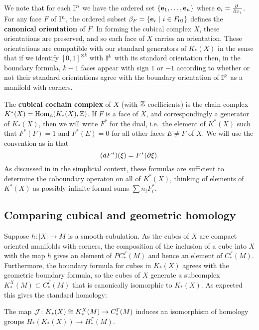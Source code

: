 We note that for each $\mathbb{I}^n$ we have the ordered set $\{\mathbf{e}_1, \dots, \mathbf{e}_n\}$ where $\mathbf{e}_i = \frac{\partial\ }{\partial x_i}$.
For any face $F$ of $\mathbb{I}^n$, the ordered subset $\beta_F = \{\mathbf{e}_i\ |\ i \in F_{01}\}$ defines the \textbf{canonical orientation} of $F$.
In forming the cubical complex $X$, these orientations are preserved, and so each face of $X$ carries an orientation.
These orientations are compatible with our standard generators of $K_*(X)$ in the sense that if we identify $[0,1]^{ \otimes k}$ with $\mathbb{I}^k$ with its standard orientation then, in the boundary formula, $k-1$ faces appear with sign $1$ or $-1$ according to whether or not their standard orientations agree with the boundary orientation of $\mathbb{I}^k$ as a manifold with corners.

The \textbf{cubical cochain complex} of $X$ (with $\mathbb{Z}$ coefficients) is the chain complex $K^*(X) = \textup{Hom}_{\mathbb{Z}}(K_*(X), \mathbb{Z})$.
If $F$ is a face of $X$, and correspondingly a generator of $K_*(X)$, then we will write $F^*$ for the dual, i.e.\ the element of $K^*(X)$ such that $F^*(F) = 1$ and $F^*(E) = 0$ for all other faces $E\neq F$ of $X$.
We will use the convention as in \cite[Section 42]{Mun84} that
$$(dF^*)(\xi) = F^*(\partial \xi).$$
As discussed in \cite[Section 42]{Mun84} in the simplicial context, these formulas are sufficient to determine the coboundary operaton on all of $K^*(X)$, thinking of elements of $K^*(X)$ as possibly infinite formal sums $\sum n_i F_i^*$.


\subsection{Comparing cubical and geometric homology}\label{S: cubical and geometric homology}

Suppose $h \colon |X| \to M$ is a smooth cubulation.
As the cubes of $X$ are compact oriented manifolds with corners, the composition of the inclusion of a cube into $X$ with the map $h$ gives an element of $PC_*^\Gamma(M)$ and hence an element of $C_*^\Gamma(M)$.
Furthermore, the boundary formula for cubes in $K_*(X)$ agrees with the geometric boundary formula, so the cubes of $X$ generate a subcomplex $K^X_*(M) \subset C^\Gamma_*(M)$ that is canonically isomorphic to $K_*(X)$.
As expected this gives the standard homology:

\begin{theorem}\label{T: cubical homology iso}
	The map $\mathcal{J} \colon K_*(X) \cong K^X_*(M) \to C^\Gamma_*(M)$ induces an isomorphism of homology groups $H_*(K_*(X)) \to H_*^\Gamma(M)$.
\end{theorem}

